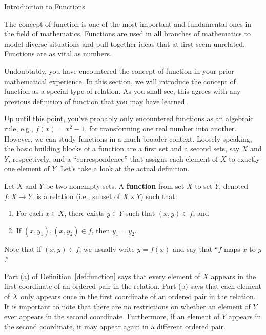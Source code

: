 \begin{section}{Introduction to Functions}

The concept of function is one of the most important and fundamental ones in the field of mathematics.  Functions are used in all branches of mathematics to model diverse situations and pull together ideas that at first seem unrelated.  Functions are as vital as numbers.

Undoubtably, you have encountered the concept of function in your prior mathematical experience.  In this section, we will introduce the concept of function as a special type of relation.  As you shall see, this agrees with any previous definition of function that you may have learned.  

Up until this point, you've probably only encountered functions as an algebraic rule, e.g., $f(x)=x^{2}-1$, for transforming one real number into another.  However, we can study functions in a much broader context.  Loosely speaking, the basic building blocks of a function are a first set and a second sets, say $X$ and $Y$, respectively, and a ``correspondence'' that assigns each element of $X$ to exactly one element of $Y$.  Let's take a look at the actual definition.

\begin{definition}\label{def:function}
Let $X$ and $Y$ be two nonempty sets.  A \textbf{function} from set $X$ to set $Y$, denoted $f:X\to Y$, is a relation (i.e., subset of $X\times Y$) such that:
\begin{enumerate}[label=\textrm{(\alph*)}]
\item For each $x\in X$, there exists $y\in Y$ such that $(x,y)\in f$, and
\item If $(x,y_{1}), (x,y_{2}) \in f$, then $y_{1}=y_{2}$.
\end{enumerate}
Note that if $(x,y)\in f$, we usually write $y=f(x)$ and say that ``$f$ maps $x$ to $y$.''
\end{definition}

Part (a) of Definition~\ref{def:function} says that every element of $X$ appears in the first coordinate of an ordered pair in the relation.  Part (b) says that each element of $X$ only appears once in the first coordinate of an ordered pair in the relation.  It is important to note that there are no restrictions on whether an element of $Y$ ever appears in the second coordinate.  Furthermore, if an element of $Y$ appears in the second coordinate, it may appear again in a different ordered pair.


\end{section}
